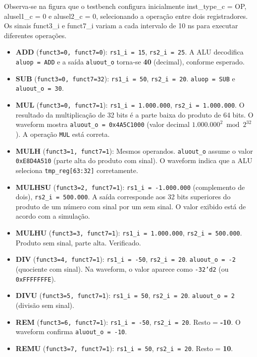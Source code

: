 \documentclass[
	12pt,				%
	oneside,
	a4paper,			%
	english,			%
	french,				%
	spanish,			%
	brazil,				%
	]{abntex2}
\begin{document}
Observa‑se na figura que o testbench configura inicialmente inst\_type\_c = OP, alusel1\_c = 0 e alusel2\_c = 0, selecionando a operação entre dois registradores. Os sinais funct3\_i e funct7\_i variam a cada intervalo de 10 ns para executar diferentes operações.

\begin{itemize}
\item \textbf{ADD} (\texttt{funct3=0, funct7=0}): \texttt{rs1\_i = 15}, \texttt{rs2\_i = 25}. A ALU decodifica \texttt{aluop = ADD} e a saída \texttt{aluout\_o} torna‑se \textbf{40} (decimal), conforme esperado.
\item \textbf{SUB} (\texttt{funct3=0, funct7=32}): \texttt{rs1\_i = 50}, \texttt{rs2\_i = 20}. \texttt{aluop = SUB} e \texttt{aluout\_o = 30}.
\item \textbf{MUL} (\texttt{funct3=0, funct7=1}): \texttt{rs1\_i = 1.000.000}, \texttt{rs2\_i = 1.000.000}. O resultado da multiplicação de 32 bits é a parte baixa do produto de 64 bits. O waveform mostra \texttt{aluout\_o = 0x4A5C1000} (valor decimal $1.000.000^2 \bmod 2^{32}$). A operação \texttt{MUL} está correta.
\item \textbf{MULH} (\texttt{funct3=1, funct7=1}): Mesmos operandos. \texttt{aluout\_o} assume o valor \texttt{0xE8D4A510} (parte alta do produto com sinal). O waveform indica que a ALU seleciona \texttt{tmp\_reg[63:32]} corretamente.
\item \textbf{MULHSU} (\texttt{funct3=2, funct7=1}): \texttt{rs1\_i = -1.000.000} (complemento de dois), \texttt{rs2\_i = 500.000}. A saída corresponde aos 32 bits superiores do produto de um número com sinal por um sem sinal. O valor exibido está de acordo com a simulação.
\item \textbf{MULHU} (\texttt{funct3=3, funct7=1}): \texttt{rs1\_i = 1.000.000}, \texttt{rs2\_i = 500.000}. Produto sem sinal, parte alta. Verificado.
\item \textbf{DIV} (\texttt{funct3=4, funct7=1}): \texttt{rs1\_i = -50}, \texttt{rs2\_i = 20}. \texttt{aluout\_o = -2} (quociente com sinal). Na waveform, o valor aparece como \texttt{-32'd2} (ou \texttt{0xFFFFFFFE}).
\item \textbf{DIVU} (\texttt{funct3=5, funct7=1}): \texttt{rs1\_i = 50}, \texttt{rs2\_i = 20}. \texttt{aluout\_o = 2} (divisão sem sinal).
\item \textbf{REM} (\texttt{funct3=6, funct7=1}): \texttt{rs1\_i = -50}, \texttt{rs2\_i = 20}. Resto = \textbf{-10}. O waveform confirma \texttt{aluout\_o = -10}.
\item \textbf{REMU} (\texttt{funct3=7, funct7=1}): \texttt{rs1\_i = 50}, \texttt{rs2\_i = 20}. Resto = \textbf{10}.
\end{itemize}
\end{document}
